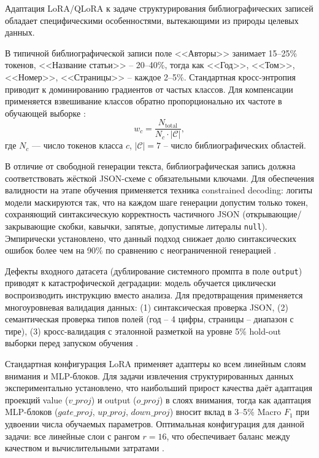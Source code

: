 Адаптация LoRA/QLoRA к задаче структурирования библиографических записей обладает специфическими особенностями, вытекающими из природы целевых данных.

В типичной библиографической записи поле <<Авторы>> занимает 15--25\% токенов, <<Название статьи>> -- 20--40\%, тогда как <<Год>>, <<Том>>, <<Номер>>, <<Страницы>> -- каждое 2--5\%. Стандартная кросс-энтропия приводит к доминированию градиентов от частых классов. Для компенсации применяется взвешивание классов обратно пропорционально их частоте в обучающей выборке \cite{chawla2002smote, jiang2023llm_imbalance}:
\begin{equation}
w_c = \frac{N_{\text{total}}}{N_c \cdot |\mathcal{C}|},
\end{equation}
где $N_c$ --- число токенов класса $c$, $|\mathcal{C}| = 7$ -- число библиографических областей.

В отличие от свободной генерации текста, библиографическая запись должна соответствовать жёсткой JSON-схеме с обязательными ключами. Для обеспечения валидности на этапе обучения применяется техника constrained decoding: логиты модели маскируются так, что на каждом шаге генерации допустим только токен, сохраняющий синтаксическую корректность частичного JSON (открывающие/закрывающие скобки, кавычки, запятые, допустимые литералы \texttt{null}). Эмпирически установлено, что данный подход снижает долю синтаксических ошибок более чем на 90\% по сравнению с неограниченной генерацией \cite{willard2023efficient, geng2023constrained}.

Дефекты входного датасета (дублирование системного промпта в поле \texttt{output}) приводят к катастрофической деградации: модель обучается циклически воспроизводить инструкцию вместо анализа. Для предотвращения применяется многоуровневая валидация данных: (1) синтаксическая проверка JSON, (2) семантическая проверка типов полей (год -- 4 цифры, страницы -- диапазон с тире), (3) кросс-валидация с эталонной разметкой на уровне 5\% hold-out выборки перед запуском обучения \cite{liu2023parameter, wang2024llm_data_quality}.

Стандартная конфигурация LoRA применяет адаптеры ко всем линейным слоям внимания и MLP-блоков. Для задачи извлечения структурированных данных экспериментально установлено, что наибольший прирост качества даёт адаптация проекций value ($v\_proj$) и output ($o\_proj$) в слоях внимания, тогда как адаптация MLP-блоков ($gate\_proj$, $up\_proj$, $down\_proj$) вносит вклад в 3--5\% Macro $F_1$ при удвоении числа обучаемых параметров. Оптимальная конфигурация для данной задачи: все линейные слои с рангом $r=16$, что обеспечивает баланс между качеством и вычислительными затратами \cite{hu2022lora, kumar2024lora_target}.